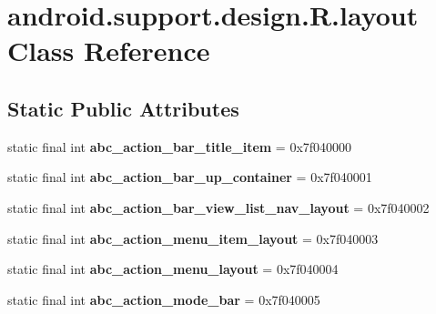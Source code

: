 \hypertarget{classandroid_1_1support_1_1design_1_1_r_1_1layout}{}\section{android.\+support.\+design.\+R.\+layout Class Reference}
\label{classandroid_1_1support_1_1design_1_1_r_1_1layout}
\subsection*{Static Public Attributes}
\begin{DoxyCompactItemize}
\item 
\hypertarget{classandroid_1_1support_1_1design_1_1_r_1_1layout_a531b33a0bb0538dd1d077ef414f13912}{}static final int {\bfseries abc\+\_\+action\+\_\+bar\+\_\+title\+\_\+item} = 0x7f040000\label{classandroid_1_1support_1_1design_1_1_r_1_1layout_a531b33a0bb0538dd1d077ef414f13912}

\item 
\hypertarget{classandroid_1_1support_1_1design_1_1_r_1_1layout_a65ed125f76e124be64ba517ed6388a2f}{}static final int {\bfseries abc\+\_\+action\+\_\+bar\+\_\+up\+\_\+container} = 0x7f040001\label{classandroid_1_1support_1_1design_1_1_r_1_1layout_a65ed125f76e124be64ba517ed6388a2f}

\item 
\hypertarget{classandroid_1_1support_1_1design_1_1_r_1_1layout_a079dfdfef917e52dcfe6fe5f09bbb311}{}static final int {\bfseries abc\+\_\+action\+\_\+bar\+\_\+view\+\_\+list\+\_\+nav\+\_\+layout} = 0x7f040002\label{classandroid_1_1support_1_1design_1_1_r_1_1layout_a079dfdfef917e52dcfe6fe5f09bbb311}

\item 
\hypertarget{classandroid_1_1support_1_1design_1_1_r_1_1layout_aa31161c408085d6a0ce8b75edb2821bf}{}static final int {\bfseries abc\+\_\+action\+\_\+menu\+\_\+item\+\_\+layout} = 0x7f040003\label{classandroid_1_1support_1_1design_1_1_r_1_1layout_aa31161c408085d6a0ce8b75edb2821bf}

\item 
\hypertarget{classandroid_1_1support_1_1design_1_1_r_1_1layout_a950d7d0ec60597ed0fceff4da4d8a6ee}{}static final int {\bfseries abc\+\_\+action\+\_\+menu\+\_\+layout} = 0x7f040004\label{classandroid_1_1support_1_1design_1_1_r_1_1layout_a950d7d0ec60597ed0fceff4da4d8a6ee}

\item 
\hypertarget{classandroid_1_1support_1_1design_1_1_r_1_1layout_a4ed2ccdae8bbfabdb968a36d217cfb5e}{}static final int {\bfseries abc\+\_\+action\+\_\+mode\+\_\+bar} = 0x7f040005\label{classandroid_1_1support_1_1design_1_1_r_1_1layout_a4ed2ccdae8bbfabdb968a36d217cfb5e}


\end{DoxyCompactItemize}
